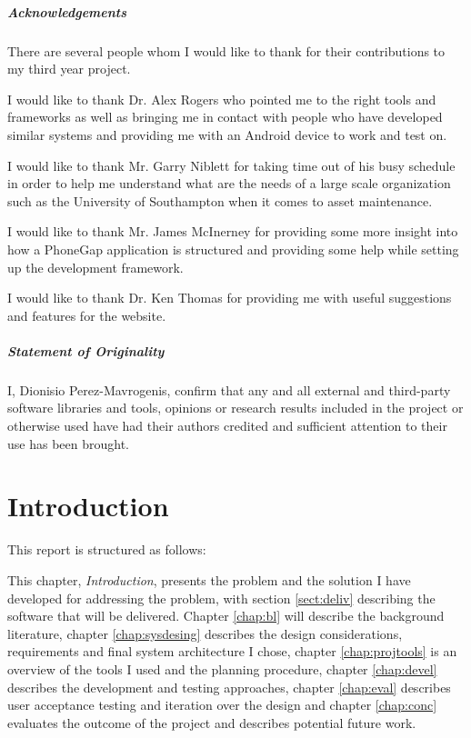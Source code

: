 \documentclass[12pt]{ecsproject}     %
\begin{document}
\paragraph{Acknowledgements} There are several people whom I would like to thank for their contributions to my third year project.

I would like to thank Dr. Alex Rogers who pointed me to the right tools and frameworks as well as bringing me in contact with people who have developed similar systems and providing me with an Android device to work and test on.

I would like to thank Mr. Garry Niblett for taking time out of his busy schedule in order to help me understand what are the needs of a large scale organization such as the University of Southampton when it comes to asset maintenance.

I would like to thank Mr. James McInerney for providing some more insight into how a PhoneGap application is structured and providing some help while setting up the development framework.

I would like to thank Dr. Ken Thomas for providing me with useful suggestions and features for the website.

\paragraph{Statement of Originality} I, Dionisio Perez-Mavrogenis, confirm that any and all external and third-party software libraries and tools, opinions or research results included in the project or otherwise used have had their authors credited and sufficient attention to their use has been brought.

\mainmatter


\chapter{Introduction}
This report is structured as follows:

This chapter, \textit{Introduction}, presents the problem and the solution I have developed for addressing the problem, with section \ref{sect:deliv} describing the software that will be delivered. Chapter \ref{chap:bl} will describe the background literature, chapter  \ref{chap:sysdesing} describes the design considerations, requirements and final system architecture I chose, chapter \ref{chap:projtools} is an overview of the tools I used and the planning procedure, chapter \ref{chap:devel} describes the development and testing approaches, chapter \ref{chap:eval} describes user acceptance testing and iteration over the design and chapter \ref{chap:conc} evaluates the outcome of the project and describes potential future work.
\end{document}

